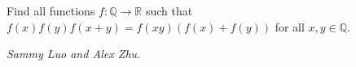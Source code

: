 Find all functions $f : \mathbb{Q} \to \mathbb{R}$ such that $f(x)f(y)f(x+y) = f(xy)(f(x) + f(y))$ for all $x,y\in\mathbb{Q}$.

\textit{Sammy Luo and Alex Zhu.}